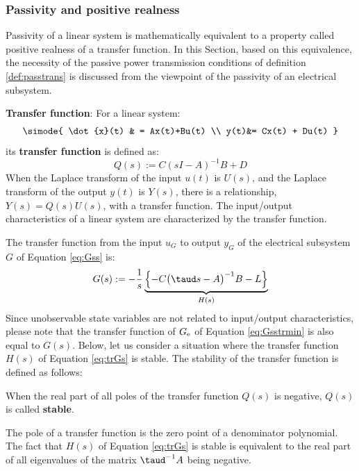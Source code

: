 \documentclass[tombow,dvipdfmx]{corona-a5-1.1}
\begin{document}
\smallskip
\subsubsection{Passivity and positive realness}

Passivity of a linear system is mathematically equivalent to a property called positive realness of a transfer function.
In this Section, based on this equivalence, the necessity of the passive power transmission conditions of definition \ref{def:passtrans} is discussed from the viewpoint of the passivity of an electrical subsystem.

\begin{COLUMN}
\noindent \textbf{Transfer function}:
For a linear system:
\begin{align*}
\simode{
\dot{x}(t) & = Ax(t)+Bu(t) \\
y(t)&= Cx(t) + Du(t)
}
\end{align*}
its \textbf{transfer function} is defined as:
\[
Q(s):=C(sI-A)^{-1}B +D
\]
When the Laplace transform of the input $u(t)$ is $U(s)$, and the Laplace transform of the output $y(t)$ is $Y(s)$, there is a relationship, $Y(s)=Q(s)U(s)$, with a transfer function.
The input/output characteristics of a linear system are characterized by the transfer function.
\end{COLUMN}


The transfer function from the input $u_G$ to output $y_G$ of the electrical subsystem $G$ of Equation
\ref{eq:Gss} is:
\begin{align}\label{eq:trGs}
G(s) :=  - \frac{1}{s} 
\underbrace{
\left\{ -C \bigl( \taud s -A \bigr)^{-1} B - L \right\}
}_{H(s)}
\end{align}
Since unobservable state variables are not related to input/output characteristics, please note that the transfer function of $G_{\rm e}$ of Equation \ref{eq:Gsstrmin} is also equal to $G(s)$.
Below, let us consider a situation where the transfer function $H(s)$ of Equation \ref{eq:trGs} is stable.
The stability of the transfer function is defined as follows:

\begin{定義}\label{def:trsta}
When the real part of all poles of the transfer function $Q(s)$ is negative, $Q(s)$ is called \textbf{stable}.
\end{定義}

The pole of a transfer function is the zero point of a denominator polynomial. The fact that $H(s)$ of Equation \ref{eq:trGs} is stable is equivalent to the
real part of all eigenvalues of the matrix $\taud^{-1}A$ being negative.
\end{document}
